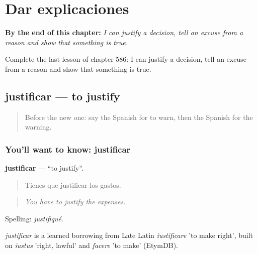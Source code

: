 
\chapter{Dar explicaciones}
\label{ch:es-dar-explicaciones}

\begin{chapteropening}
\textbf{By the end of this chapter:} \emph{I can justify a decision, tell an excuse from a reason and show that something is true.}

Complete the last lesson of chapter 586: I can justify a decision, tell an excuse from a reason and show that something is true.
\end{chapteropening}

\section[justificar]{justificar — to justify}

\label{lesson:ES-C586-justificar}



\begin{quote}
Before the new one: say the Spanish for to warn, then the Spanish for the warning.
\end{quote}

\subsection*{You'll want to know: justificar}
\textbf{justificar} — \textquotedblleft{}to justify\textquotedblright{}.

\begin{quote}
Tienes que justificar los gastos.
\end{quote}

\begin{quote}
\emph{You have to justify the expenses.}
\end{quote}

Spelling: \emph{justifiqué}.

\begin{cousinweb}
\emph{justificar} is a learned borrowing from Late Latin \emph{iustificare} 'to make right', built on \emph{iustus} 'right, lawful' and \emph{facere} 'to make' (EtymDB).
\end{cousinweb}

